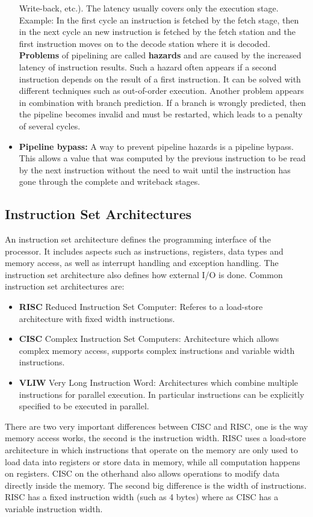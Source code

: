 \documentclass[a4paper,10pt]{article}
\begin{document}
\begin{itemize}
Write-back, etc.). The latency usually covers only the execution stage. Example: In the first cycle an instruction is fetched by the 
fetch stage, then in the next cycle an new instruction is fetched by the fetch station and the first instruction moves on to the decode 
station where it is decoded. \textbf{Problems} of pipelining are called \textbf{hazards} and are caused by the increased latency of 
instruction results. Such a hazard often appears if a second instruction depends on the result of a first instruction. It can be solved 
with different techniques such as out-of-order execution. Another problem appears in combination with branch prediction. If a branch is 
wrongly predicted, then the pipeline becomes invalid and must be restarted, which leads to a penalty of several cycles.
\item \textbf{Pipeline bypass:} A way to prevent pipeline hazards is a pipeline bypass. This allows a value that was computed by the 
previous instruction to be read by the next instruction without the need to wait until the instruction has gone through the complete and 
writeback stages.
\end{itemize}	

\subsection{Instruction Set Architectures}
An instruction set architecture defines the programming interface of the processor. It includes aspects such as instructions, registers, 
data types and memory access, as well as interrupt handling and exception handling. The instruction set architecture also defines how 
external I/O is done. Common instruction set architectures are:
\begin{itemize}
 \item \textbf{RISC} Reduced Instruction Set Computer: Referes to a load-store architecture with fixed width instructions.
 \item \textbf{CISC} Complex Instruction Set Computers: Architecture which allows complex memory access, supports complex instructions
       and variable width instructions.
 \item \textbf{VLIW} Very Long Instruction Word: Architectures which combine multiple instructions for parallel execution. In particular
       instructions can be explicitly specified to be executed in parallel.
\end{itemize}

There are two very important differences between CISC and RISC, one is the way memory access works, the second is the instruction width. 
RISC uses a load-store architecture in which instructions that operate on the memory are only used to load data into registers or store 
data in memory, while all computation happens on registers. CISC on the otherhand also allows operations to modify data directly inside 
the memory. The second big difference is the width of instructions. RISC has a fixed instruction width (such as 4 bytes) where as CISC 
has a variable instruction width.
\end{document}
